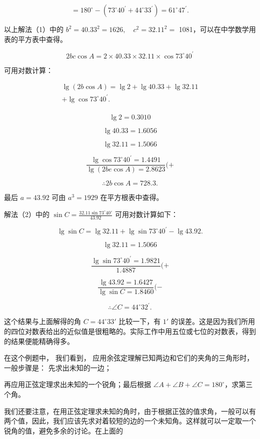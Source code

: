 \[
= 180 ^{\circ} - (73 ^{\circ} 40 ^{\prime} + 44 ^{\circ} 33 ^{\prime}) = 61 ^{\circ} 47 ^{\prime}.
\]

 以上解法（1）中的
\(b^{2}=40.33^{2}=1626,\quad c^{2}=32.11^{2}=\)
1081，可以在中学数学用表的平方表中查得。

\[
2 b c \cos A = 2 \times 40.33 \times 32.11 \times \cos 73 ^{\circ} 40 ^{\prime}
\]

可用对数计算：

\[
\begin{array}{l} \lg (2 b \cos A) = \lg 2 + \lg 40.33 + \lg 32.11 \\ + \lg \cos 73 ^{\circ} 40 ^{\prime}. \\ \end{array}
\]

\[
\lg 2 = 0.3010
\]

\[
\lg 40.33 = 1.6056
\]

\[
\lg 32.11 = 1.5066
\]

\[
\frac {\lg \cos 73 ^{\circ} 40 ^{\prime} = 1.4491}{\lg (2 b e \cos A) = 2.8623} (+
\]

\[
\therefore 2 b \cos A = 728.3.
\]

最后 \(a = 43.92\) 可由 \(a^3 = 1929\) 在平方根表中查得。

解法（2）中的 \(\sin C = \frac{32.11\sin 73^{\circ}40'}{43.92}\)
可用对数计算如下：

\[
\lg \sin C = \lg 32.11 + \lg \sin 73 ^{\circ} 40 ^{\prime} - \lg 43.92.
\]

\[
\lg 32.11 = 1.5066
\]

\[
\frac {\lg \sin 73 ^{\circ} 40 ^{\prime} = 1.9821}{1.4887} (+
\]

\[
\frac {\lg 43.92 = 1.6427}{\lg \sin C = 1.8460} (-
\]

\[
\therefore \angle C = 44 ^{\circ} 32 ^{\prime}.
\]

这个结果与上面解得的角 \(C = 44^{\circ}33'\) 比较一下，有 \(1'\)
的误差。这是因为我们所用的四位对数表给出的近似值是很粗略的。实际工作中用五位或七位的对数表，得到的结果便能精确得多。

在这个例题中， 我们看到， 应用余弦定理解已知两边和它们的夹角的三角形时，
一般步骤是： 先求出未知的一边；

再应用正弦定理求出未知的一个锐角；最后根据
\(\angle A + \angle B + \angle C = 180^{\circ}\)，求第三个角。

我们还要注意，在用正弦定理求未知的角时，由于根据正弦的值求角，一般可以有两个值，因此，我们应该先求对着较短的边的一个未知角。这样就可以一定取一个锐角的值，避免多余的讨论。在上面的

